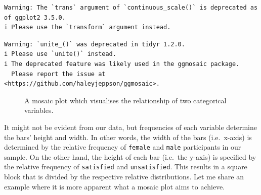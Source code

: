 \documentclass[
  letterpaper,
]{krantz}
\begin{document}
\begin{verbatim}
Warning: The `trans` argument of `continuous_scale()` is deprecated as of ggplot2 3.5.0.
i Please use the `transform` argument instead.
\end{verbatim}

\begin{verbatim}
Warning: `unite_()` was deprecated in tidyr 1.2.0.
i Please use `unite()` instead.
i The deprecated feature was likely used in the ggmosaic package.
  Please report the issue at <https://github.com/haleyjeppson/ggmosaic>.
\end{verbatim}

\begin{figure}[H]


\caption{\label{fig-mosaic-plot}A mosaic plot which visualises the
relationship of two categorical variables.}

\end{figure}%

It might not be evident from our data, but frequencies of each variable
determine the bars' height and width. In other words, the width of the
bars (i.e.~x-axis) is determined by the relative frequency of
\texttt{female} and \texttt{male} participants in our sample. On the
other hand, the height of each bar (i.e.~the y-axis) is specified by the
relative frequency of \texttt{satisfied} and \texttt{unsatisfied}. This
results in a square block that is divided by the respective relative
distributions. Let me share an example where it is more apparent what a
mosaic plot aims to achieve.
\end{document}
